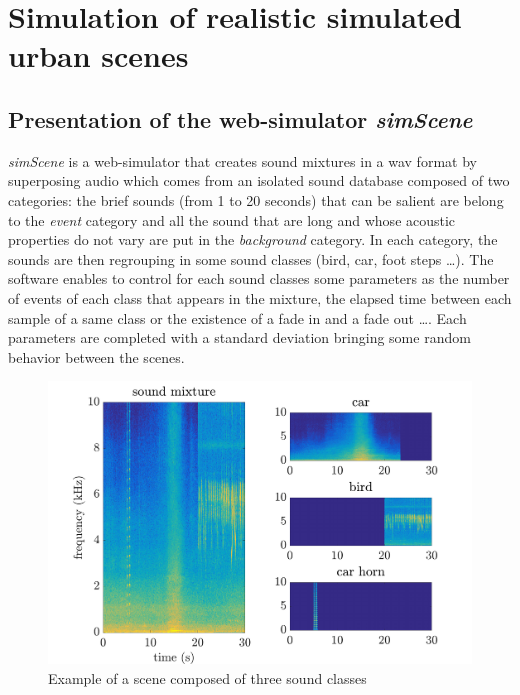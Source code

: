 \documentclass[a4,11pt,twocolumn]{article}
\begin{document}
\section{Simulation of realistic simulated urban scenes} \label{sec:simulation}
\subsection{Presentation of the web-simulator \textit{simScene}}
\textit{simScene} \cite{rossignol_simscene:_2015} is a web-simulator that creates sound mixtures in a wav format by superposing audio which comes from an isolated sound database composed of two categories: the brief sounds (from 1 to 20 seconds)
that can be salient are belong to the \textit{event} category and all the sound that are long and whose acoustic properties do not vary are put in the \textit{background} category. In each category, the sounds are then regrouping in some sound classes (bird, car, foot steps \dots). The software enables to control for each sound classes some parameters as the number of events of each class that appears in the mixture, the elapsed time between each sample of a same class or the existence of a fade in and a fade out \dots. Each parameters are completed with a standard deviation bringing some random behavior between the scenes. \\


\begin{figure}[h]
\centering
\includegraphics[width = \linewidth]{./pictures/spectrogramme_abstract_sceneSimpleKlaxonFixe_EN.pdf}
\caption{Example of a scene composed of three sound classes}
\label{fig:exampleSimScene}
\end{figure}
\end{document}
